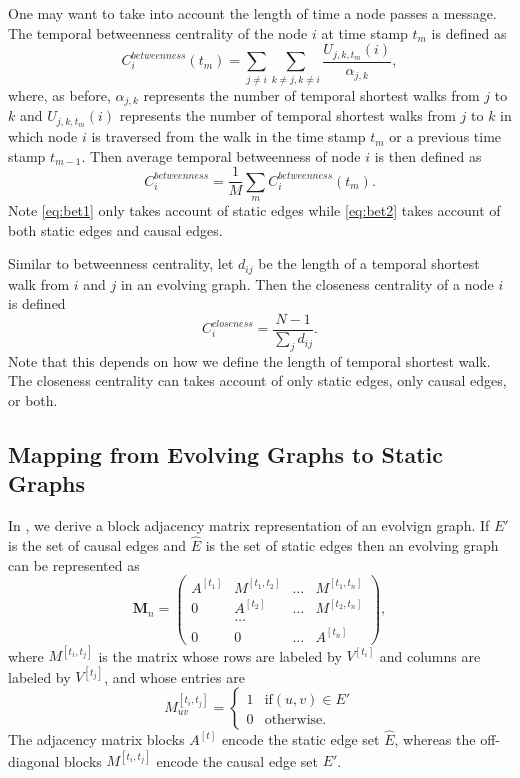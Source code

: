 \documentclass[12pt]{article}
\theoremstyle{definition}
\begin{document}
One may want to take into account the length of time a node passes a message. The temporal betweenness centrality of the node $i$ at time stamp $t_m$ is defined as
\begin{equation}
  \label{eq:bet2}
  C_i^{betweenness}(t_m) = \sum_{j\ne i}\sum_{k\ne j, k\ne i}\frac{U_{j,k,t_m}(i)}{\alpha_{j,k}},
\end{equation}
where, as before, $\alpha_{j,k}$ represents the number of temporal shortest walks from $j$ to $k$ and $U_{j,k,t_m}(i)$ represents the number of temporal shortest walks from $j$ to $k$ in which node $i$ is traversed from
the walk in the time stamp $t_m$ or a previous time stamp $t_{m-1}$. Then
average temporal betweenness of node $i$ is then defined as
$$
  C_i^{betweenness} = \frac{1}{M}\sum_m C_i^{betweenness}(t_m).
$$
Note \eqref{eq:bet1} only takes account of static edges while \eqref{eq:bet2} takes account of both static edges and causal edges.

Similar to betweenness centrality, let $d_{ij}$ be the length of a temporal shortest walk from $i$ and $j$ in an evolving graph. Then
the closeness centrality of a node $i$ is defined
$$
C_i^{closeness} = \frac{N-1}{\sum_j d_{ij}}.
$$
Note that this depends on how we define the length of temporal shortest walk. The closeness centrality can takes account of only static edges, only causal edges, or both.


\subsection{Mapping from Evolving Graphs to Static Graphs}
\label{sec:centr-block-adjac}

In \cite{chen16}, we derive a block adjacency matrix representation of an evolvign graph.
If $E'$ is the set of causal edges and $\hat E$ is the set of static edges then
an evolving graph can be represented as
$$
\bm M_n =
\begin{pmatrix}
A^{[t_1]} & M^{[t_1, t_2]} & \ldots & M^{[t_1, t_n]} \\
0         & A^{[t_2]} & \ldots & M^{[t_2, t_n]} \\
          & \ldots    &        &     \\
0         & 0         & \ldots & A^{[t_n]}
\end{pmatrix},
$$
where $M^{[t_i, t_j]}$ is the matrix whose rows are labeled by $V^{[t_i]}$ and columns are labeled by $V^{[t_j]}$, and whose entries are
$$
  M_{uv}^{[t_i, t_j]} =
  \begin{cases}
    1 & \mbox{if} (u, v) \in E' \\
    0 & \mbox{otherwise}.
  \end{cases}
$$
The adjacency matrix blocks $A^{[t]}$ encode the static edge set $\hat E$, whereas the off-diagonal blocks $M^{[t_i, t_j]}$ encode the causal edge set $E'$.
\end{document}
